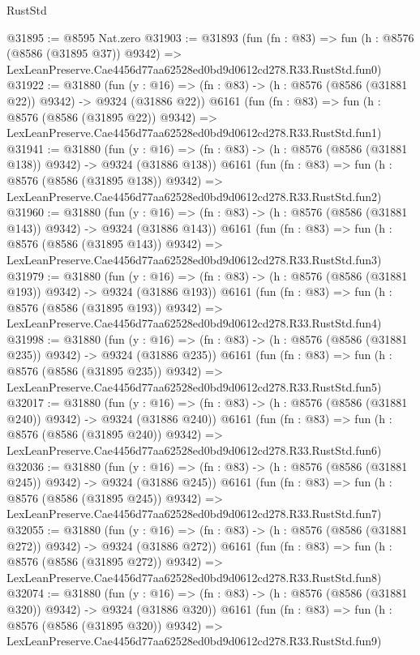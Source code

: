 \begin{lexlean}{RustStd}
\begin{coremodule}
@31895 := @8595 Nat.zero
@31903 := @31893
    (fun (fn : @83) =>
    fun (h : @8576 (@8586 (@31895 @37)) @9342) =>
    LexLeanPreserve.Cae4456d77aa62528ed0bd9d0612cd278.R33.RustStd.fun0)
@31922 := @31880
    (fun (y : @16) => (fn : @83) -> (h : @8576 (@8586 (@31881 @22)) @9342) -> @9324 (@31886 @22))
    @6161
    (fun (fn : @83) =>
    fun (h : @8576 (@8586 (@31895 @22)) @9342) =>
    LexLeanPreserve.Cae4456d77aa62528ed0bd9d0612cd278.R33.RustStd.fun1)
@31941 := @31880
    (fun (y : @16) => (fn : @83) -> (h : @8576 (@8586 (@31881 @138)) @9342) -> @9324 (@31886 @138))
    @6161
    (fun (fn : @83) =>
    fun (h : @8576 (@8586 (@31895 @138)) @9342) =>
    LexLeanPreserve.Cae4456d77aa62528ed0bd9d0612cd278.R33.RustStd.fun2)
@31960 := @31880
    (fun (y : @16) => (fn : @83) -> (h : @8576 (@8586 (@31881 @143)) @9342) -> @9324 (@31886 @143))
    @6161
    (fun (fn : @83) =>
    fun (h : @8576 (@8586 (@31895 @143)) @9342) =>
    LexLeanPreserve.Cae4456d77aa62528ed0bd9d0612cd278.R33.RustStd.fun3)
@31979 := @31880
    (fun (y : @16) => (fn : @83) -> (h : @8576 (@8586 (@31881 @193)) @9342) -> @9324 (@31886 @193))
    @6161
    (fun (fn : @83) =>
    fun (h : @8576 (@8586 (@31895 @193)) @9342) =>
    LexLeanPreserve.Cae4456d77aa62528ed0bd9d0612cd278.R33.RustStd.fun4)
@31998 := @31880
    (fun (y : @16) => (fn : @83) -> (h : @8576 (@8586 (@31881 @235)) @9342) -> @9324 (@31886 @235))
    @6161
    (fun (fn : @83) =>
    fun (h : @8576 (@8586 (@31895 @235)) @9342) =>
    LexLeanPreserve.Cae4456d77aa62528ed0bd9d0612cd278.R33.RustStd.fun5)
@32017 := @31880
    (fun (y : @16) => (fn : @83) -> (h : @8576 (@8586 (@31881 @240)) @9342) -> @9324 (@31886 @240))
    @6161
    (fun (fn : @83) =>
    fun (h : @8576 (@8586 (@31895 @240)) @9342) =>
    LexLeanPreserve.Cae4456d77aa62528ed0bd9d0612cd278.R33.RustStd.fun6)
@32036 := @31880
    (fun (y : @16) => (fn : @83) -> (h : @8576 (@8586 (@31881 @245)) @9342) -> @9324 (@31886 @245))
    @6161
    (fun (fn : @83) =>
    fun (h : @8576 (@8586 (@31895 @245)) @9342) =>
    LexLeanPreserve.Cae4456d77aa62528ed0bd9d0612cd278.R33.RustStd.fun7)
@32055 := @31880
    (fun (y : @16) => (fn : @83) -> (h : @8576 (@8586 (@31881 @272)) @9342) -> @9324 (@31886 @272))
    @6161
    (fun (fn : @83) =>
    fun (h : @8576 (@8586 (@31895 @272)) @9342) =>
    LexLeanPreserve.Cae4456d77aa62528ed0bd9d0612cd278.R33.RustStd.fun8)
@32074 := @31880
    (fun (y : @16) => (fn : @83) -> (h : @8576 (@8586 (@31881 @320)) @9342) -> @9324 (@31886 @320))
    @6161
    (fun (fn : @83) =>
    fun (h : @8576 (@8586 (@31895 @320)) @9342) =>
    LexLeanPreserve.Cae4456d77aa62528ed0bd9d0612cd278.R33.RustStd.fun9)

\end{coremodule}
\end{lexlean}
